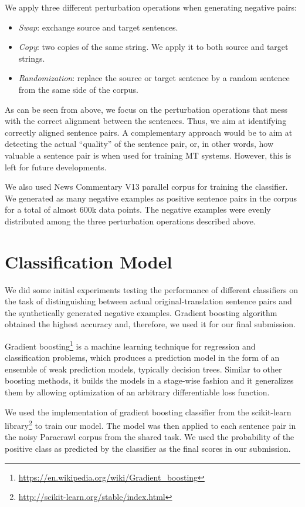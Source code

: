 \documentclass[a0]{sciposter}
\begin{document}
\begin{multicols*}{2}
We apply three different perturbation operations when generating negative pairs:
\begin{itemize}
  \item \textit{Swap}: exchange source and target sentences.
  \item \textit{Copy}: two copies of the same string. We apply it to both source and target strings.
  \item \textit{Randomization}: replace the source or target sentence by a random sentence from the same side of the corpus.
\end{itemize}

As can be seen from above, we focus on the perturbation operations that mess with the correct alignment between the sentences. Thus, we aim at identifying correctly aligned sentence pairs. A complementary approach would be to aim at detecting the actual ``quality'' of the sentence pair, or, in other words, how valuable a sentence pair is when used for training MT systems. However, this is left for future developments.

We also used News Commentary V13 parallel corpus for training the classifier. We generated as many negative examples as positive sentence pairs in the corpus for a total of almost $600$k data points. The negative examples were evenly distributed among the three perturbation operations described above.


\section*{\Large Classification Model}
We did some initial experiments testing the performance of different classifiers on the task of distinguishing between actual original-translation sentence pairs and the synthetically generated negative examples. Gradient boosting algorithm obtained the highest accuracy and, therefore, we used it for our final submission.

Gradient boosting\footnote{\url{https://en.wikipedia.org/wiki/Gradient_boosting}} is a machine learning technique for regression and classification problems, which produces a prediction model in the form of an ensemble of weak prediction models, typically decision trees. Similar to other boosting methods, it builds the models in a stage-wise fashion and it generalizes them by allowing optimization of an arbitrary differentiable loss function.

We used the implementation of gradient boosting classifier from the scikit-learn library\footnote{\url{http://scikit-learn.org/stable/index.html}} to train our model. The model was then applied to each sentence pair in the noisy Paracrawl corpus from the shared task. We used the probability of the positive class as predicted by the classifier as the final scores in our submission.



\end{multicols*}
\end{document}
